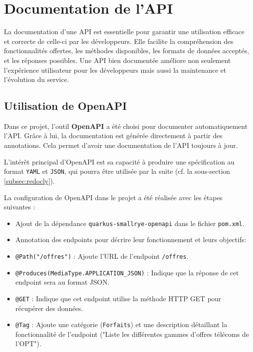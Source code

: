 \documentclass[11pt]{article}
\begin{document}
		\section{Documentation de l'API}
		
		La documentation d'une API est essentielle pour garantir une utilisation efficace et correcte de celle-ci par les développeurs. Elle facilite la compréhension des fonctionnalités offertes, les méthodes disponibles, les formats de données acceptés, et les réponses possibles. Une API bien documentée améliore non seulement l'expérience utilisateur pour les développeurs mais aussi la maintenance et l'évolution du service.
		
		\subsection{Utilisation de OpenAPI}
		
		Dans ce projet, l'outil \textbf{OpenAPI} a été choisi pour documenter automatiquement l'API. Grâce à lui, la documentation est générée directement à partir des annotations. Cela permet d'avoir une documentation de l'API toujours à jour. 
		
		L'intérêt principal d'OpenAPI est sa capacité à produire une spécification au format \texttt{YAML} et \texttt{JSON}, qui pourra être utilisée par la suite (cf. la sous-section \ref{subsec:redocly}).
		
		La configuration de OpenAPI dans le projet a été réalisée avec les étapes suivantes :
		\begin{itemize}
			\item Ajout de la dépendance \texttt{quarkus-smallrye-openapi} dans le fichier \texttt{pom.xml}.
			\item Annotation des endpoints pour décrire leur fonctionnement et leurs objectifs:
		\end{itemize}
			
		\begin{itemize}
			\item \texttt{@Path("/offres")} : Ajoute l'URL de l'endpoint \texttt{/offres}.
			\item \texttt{@Produces(MediaType.APPLICATION\_JSON)} : Indique que la réponse de cet endpoint sera au format JSON.
			\item \texttt{@GET} : Indique que cet endpoint utilise la méthode HTTP GET pour récupérer des données.
			\item \texttt{@Tag} : Ajoute une catégorie (\texttt{Forfaits}) et une description détaillant la fonctionnalité de l'endpoint ("Liste les différentes gammes d'offres télécoms de l'OPT").
		\end{itemize}
	
\end{document}
